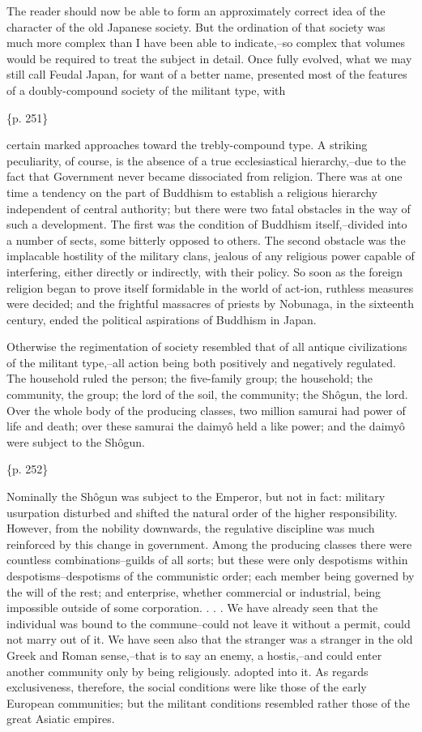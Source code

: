 The reader should now be able to form an approximately correct idea of the character of the old Japanese society. But the ordination of that society was much more complex than I have been able to indicate,--so complex that volumes would be required to treat the subject in detail. Once fully evolved, what we may still call Feudal Japan, for want of a better name, presented most of the features of a doubly-compound society of the militant type, with

\{p. 251\}

certain marked approaches toward the trebly-compound type. A striking peculiarity, of course, is the absence of a true ecclesiastical hierarchy,--due to the fact that Government never became dissociated from religion. There was at one time a tendency on the part of Buddhism to establish a religious hierarchy independent of central authority; but there were two fatal obstacles in the way of such a development. The first was the condition of Buddhism itself,--divided into a number of sects, some bitterly opposed to others. The second obstacle was the implacable hostility of the military clans, jealous of any religious power capable of interfering, either directly or indirectly, with their policy. So soon as the foreign religion began to prove itself formidable in the world of act-ion, ruthless measures were decided; and the frightful massacres of priests by Nobunaga, in the sixteenth century, ended the political aspirations of Buddhism in Japan.

Otherwise the regimentation of society resembled that of all antique civilizations of the militant type,--all action being both positively and negatively regulated. The household ruled the person; the five-family group; the household; the community, the group; the lord of the soil, the community; the Shôgun, the lord. Over the whole body of the producing classes, two million samurai had power of life and death; over these samurai the daimyô held a like power; and the daimyô were subject to the Shôgun.

\{p. 252\}

Nominally the Shôgun was subject to the Emperor, but not in fact: military usurpation disturbed and shifted the natural order of the higher responsibility. However, from the nobility downwards, the regulative discipline was much reinforced by this change in government. Among the producing classes there were countless combinations--guilds of all sorts; but these were only despotisms within despotisms--despotisms of the communistic order; each member being governed by the will of the rest; and enterprise, whether commercial or industrial, being impossible outside of some corporation. . . . We have already seen that the individual was bound to the commune--could not leave it without a permit, could not marry out of it. We have seen also that the stranger was a stranger in the old Greek and Roman sense,--that is to say an enemy, a hostis,--and could enter another community only by being religiously. adopted into it. As regards exclusiveness, therefore, the social conditions were like those of the early European communities; but the militant conditions resembled rather those of the great Asiatic empires.



